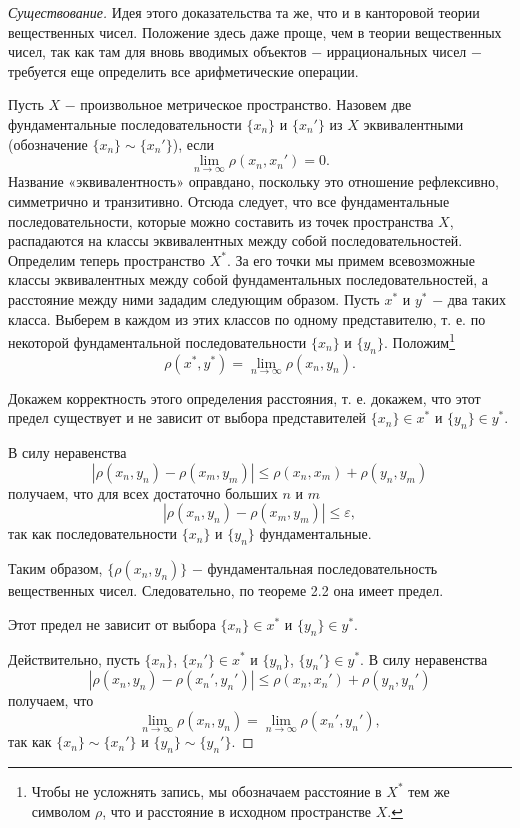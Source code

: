 \documentclass{article}
\begin{document}
\begin{proof}[Существование]
Идея этого доказательства та же, что и в канторовой теории вещественных чисел. Положение здесь даже проще, чем в теории вещественных чисел, так как там для вновь вводимых объектов \(-\) иррациональных чисел \(-\) требуется еще определить все арифметические операции.

Пусть \(X\) \(-\) произвольное метрическое пространство. Назовем две фундаментальные последовательности \(\{x_n\}\) и \(\{x_{n}'\}\) из \(X\) эквивалентными (обозначение \(\{x_n\} \sim \{x_{n}'\}\)), если
\[
\lim\limits_{n \to \infty} \rho(x_n, x_{n}') = 0.
\]
Название «эквивалентность» оправдано, поскольку это отношение рефлексивно, симметрично и транзитивно. Отсюда следует, что все фундаментальные последовательности, которые можно составить из точек пространства \(X\), распадаются на классы эквивалентных между собой последовательностей. Определим теперь пространство \(X^{*}\). За его точки мы примем всевозможные классы эквивалентных между собой фундаментальных последовательностей, а расстояние между ними зададим следующим образом. Пусть \(x^{*}\) и \(y^{*}\) \(-\) два таких класса. Выберем в каждом из этих классов по одному представителю, т. е. по некоторой фундаментальной последовательности \(\{x_n\}\) и \(\{y_n\}\). Положим\footnote{
Чтобы не усложнять запись, мы обозначаем расстояние в \(X^{*}\) тем же символом \(\rho\), что и расстояние в исходном пространстве \(X\).
}
\[
\rho(x^{*}, y^{*}) = \lim\limits_{n \to \infty} \rho(x_n, y_n).
\]

Докажем корректность этого определения расстояния, т. е. докажем, что этот предел существует и не зависит от выбора представителей \(\{x_n\} \in x^{*}\) и \(\{y_n\} \in y^{*}\).

В силу неравенства
\[
|\rho(x_n, y_n) - \rho(x_m, y_m)| \leq \rho(x_n, x_m) + \rho(y_n, y_m)
\]
получаем, что для всех достаточно больших \(n\) и \(m\)
\[
|\rho(x_n, y_n) - \rho(x_m, y_m)| \leq \varepsilon,
\]
так как последовательности \(\{x_n\}\) и \(\{y_n\}\) фундаментальные.

Таким образом, \(\{\rho(x_n, y_n)\}\) \(-\) фундаментальная последовательность вещественных чисел. Следовательно, по теореме 2.2 она имеет предел.

Этот предел не зависит от выбора \(\{x_n\} \in x^{*}\) и \(\{y_n\} \in y^{*}\).

Действительно, пусть \(\{x_n\}\), \(\{x_n'\} \in x^{*}\) и \(\{y_n\}\), \(\{y_n'\} \in y^{*}\). В силу неравенства
\[
|\rho(x_n, y_n) - \rho(x_{n}', y_{n}')| \leq \rho(x_n, x_{n}') + \rho(y_n, y_{n}')
\]
получаем, что
\[
\lim\limits_{n \to \infty} \rho(x_n, y_n) = \lim\limits_{n \to \infty} \rho(x_{n}', y_{n}'),
\]
так как \(\{x_n\} \sim \{x_{n}'\}\) и \(\{y_n\} \sim \{y_{n}'\}\).


\end{proof}
\end{document}
